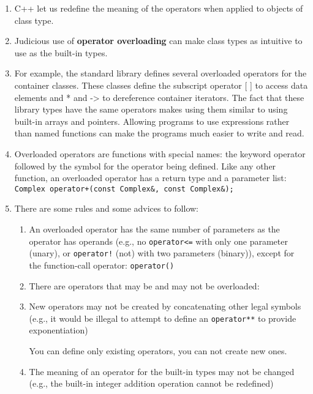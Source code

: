 \begin{enumerate}[$\triangleright$]
\item C++ let us redefine the meaning of the operators when applied to objects of class type.
\item Judicious use of \textbf{operator overloading} can make class types as intuitive to use as the built-in types.
\item For example, the standard library defines several overloaded operators for the container classes. These classes define the subscript operator [ ] to access data elements and * and -> to dereference container iterators. The fact that these library types have the same operators makes using them similar to using built-in arrays and pointers. Allowing programs to use expressions rather than named functions can make the programs much easier to write and read.
\item Overloaded operators are functions with special names: the keyword operator followed by the symbol for the operator being defined. Like any other function, an overloaded operator has a return type and a parameter list: \lstinline|Complex operator+(const Complex&, const Complex&);| 

\item There are some rules and some advices to follow:
\begin{enumerate}[(1)]
    \item An overloaded operator has the same number of parameters as the operator has operands (e.g., no \texttt{operator<=} with only one parameter (unary), or \texttt{operator!} (not) with two parameters (binary)), except for the function-call operator: \texttt{operator()}

    \item There are operators that may be and may not be overloaded:

    \item New operators may not be created by concatenating other legal symbols (e.g., it would be illegal to attempt to define an \texttt{operator**} to provide exponentiation)

    \begin{marker}
    You can define only existing operators, you can not create new ones.
    \end{marker}

    \item The meaning of an operator for the built-in types may not be changed (e.g., the built-in integer addition operation cannot be redefined)


\end{enumerate}
\end{enumerate}
